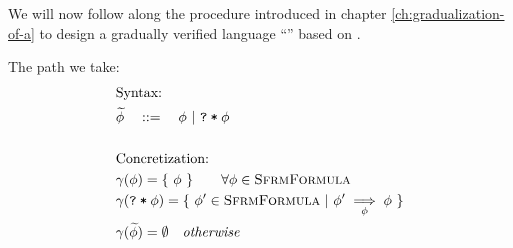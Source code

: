 We will now follow along the procedure introduced in chapter \ref{ch:gradualization-of-a} to design a gradually verified language “\gvl” based on \svl.

The path we take:
\begin{align*} 
&\text{Syntax:}\\
&\widetilde{\phi} \quad::=\quad \phi ~|~ \texttt{\texttt{?}\:*\:\ensuremath{\phi}}\\
\\
&\text{Concretization:}\\
&\gamma(\phi) = \{~ \phi ~\}     \quad\quad \forall \phi \in \textsc{SfrmFormula}\\
&\gamma(\texttt{\texttt{?}\:*\:\ensuremath{\phi}}) = \{~ \phi' \in \textsc{SfrmFormula} ~|~ {\phi'} \underset{\phi}{\implies} {\phi} ~\}\\
&\gamma(\widetilde{\phi}) = \emptyset    \quad\textit{otherwise}
\end{align*}
